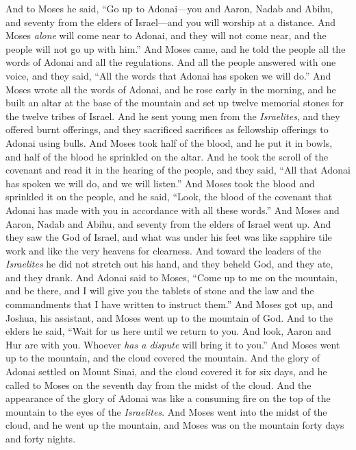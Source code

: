 \begin{biblechapter} %
 And to Moses he said, “Go up to Adonai—you and Aaron, Nadab and Abihu, and seventy from the elders of Israel—and you will worship at a distance.
\verse And Moses \textit{alone} will come near to Adonai, and they will not come near, and the people will not go up with him.”
\verse And Moses came, and he told the people all the words of Adonai and all the regulations. And all the people answered with one voice, and they said, “All the words that Adonai has spoken we will do.”
\verse And Moses wrote all the words of Adonai, and he rose early in the morning, and he built an altar at the base of the mountain and set up twelve memorial stones for the twelve tribes of Israel.
\verse And he sent young men from the \textit{Israelites}, and they offered burnt offerings, and they sacrificed sacrifices as fellowship offerings to Adonai using bulls.
\verse And Moses took half of the blood, and he put it in bowls, and half of the blood he sprinkled on the altar.
\verse And he took the scroll of the covenant and read it in the hearing of the people, and they said, “All that Adonai has spoken we will do, and we will listen.”
\verse And Moses took the blood and sprinkled it on the people, and he said, “Look, the blood of the covenant that Adonai has made with you in accordance with all these words.”
\verse And Moses and Aaron, Nadab and Abihu, and seventy from the elders of Israel went up.
\verse And they saw the God of Israel, and what was under his feet was like sapphire tile work and like the very heavens for clearness.
\verse And toward the leaders of the \textit{Israelites} he did not stretch out his hand, and they beheld God, and they ate, and they drank.
 And Adonai said to Moses, “Come up to me on the mountain, and be there, and I will give you the tablets of stone and the law and the commandments that I have written to instruct them.”
\verse And Moses got up, and Joshua, his assistant, and Moses went up to the mountain of God.
\verse And to the elders he said, “Wait for us here until we return to you. And look, Aaron and Hur are with you. Whoever \textit{has a dispute} will bring it to you.”
\verse And Moses went up to the mountain, and the cloud covered the mountain.
\verse And the glory of Adonai settled on Mount Sinai, and the cloud covered it for six days, and he called to Moses on the seventh day from the midst of the cloud.
\verse And the appearance of the glory of Adonai was like a consuming fire on the top of the mountain to the eyes of the \textit{Israelites}.
\verse And Moses went into the midst of the cloud, and he went up the mountain, and Moses was on the mountain forty days and forty nights.
\end{biblechapter}

